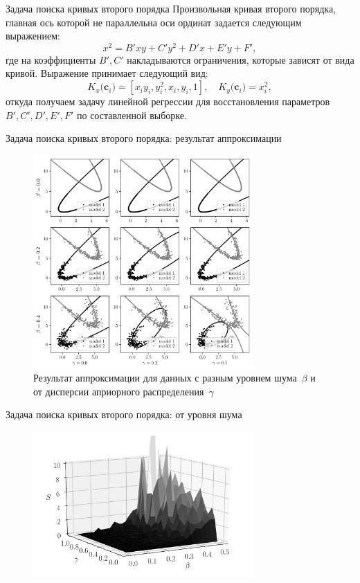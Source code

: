 \documentclass[9pt,pdf,hyperref={unicode}]{beamer}
\begin{document}
\begin{frame}{Задача поиска кривых второго порядка}
\justifying
Произвольная кривая второго порядка, главная ось которой не параллельна оси ординат задается следующим выражением:
\[
\label{st:coef}
x^2 = B'xy+C'y^2+D'x+E'y+F',
\]
где на коэффициенты $B',C'$ накладываются ограничения, которые зависят от вида кривой. Выражение принимает следующий вид:
\[
\label{st:K_map}
K_x\bigr(\mathbf{c}_i\bigr)=\left[x_iy_i, y_i^2, x_i, y_i, 1\right], \quad K_y\bigr(\mathbf{c}_i\bigr)=x_i^2,
\]
откуда получаем задачу линейной регрессии для восстановления параметров $B', C', D', E', F'$ по составленной выборке.

\end{frame}

\begin{frame}{Задача поиска кривых второго порядка: результат аппроксимации}
\justifying

\begin{figure}[h!t]\center
\includegraphics[width=0.75\textwidth]{figures/beta_gamma}
\caption{Результат аппроксимации для данных с разным уровнем шума~$\beta$ и от дисперсии априорного распределения~$\gamma$}
\end{figure}

\end{frame}

\begin{frame}{Задача поиска кривых второго порядка: от уровня шума}
\justifying

\begin{figure}[h!t]\center
\includegraphics[width=0.75\textwidth]{figures/3dplot}
\end{figure}

\end{frame}
\end{document}

